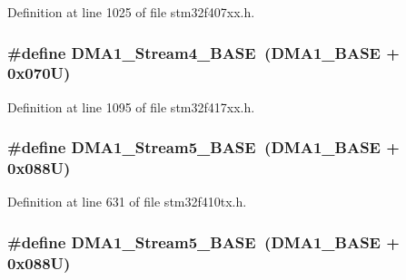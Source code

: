 Definition at line 1025 of file stm32f407xx.\+h.

\subsubsection[{\texorpdfstring{D\+M\+A1\+\_\+\+Stream4\+\_\+\+B\+A\+SE}{DMA1_Stream4_BASE}}]{\setlength{\rightskip}{0pt plus 5cm}\#define D\+M\+A1\+\_\+\+Stream4\+\_\+\+B\+A\+SE~({\bf D\+M\+A1\+\_\+\+B\+A\+SE} + 0x070\+U)}\hypertarget{group___peripheral__registers__structures_ga757a3c0d866c0fe68c6176156065a26b}{}\label{group___peripheral__registers__structures_ga757a3c0d866c0fe68c6176156065a26b}


Definition at line 1095 of file stm32f417xx.\+h.

\subsubsection[{\texorpdfstring{D\+M\+A1\+\_\+\+Stream5\+\_\+\+B\+A\+SE}{DMA1_Stream5_BASE}}]{\setlength{\rightskip}{0pt plus 5cm}\#define D\+M\+A1\+\_\+\+Stream5\+\_\+\+B\+A\+SE~({\bf D\+M\+A1\+\_\+\+B\+A\+SE} + 0x088\+U)}\hypertarget{group___peripheral__registers__structures_ga0ded7bed8969fe2e2d616e7f90eb7654}{}\label{group___peripheral__registers__structures_ga0ded7bed8969fe2e2d616e7f90eb7654}


Definition at line 631 of file stm32f410tx.\+h.

\subsubsection[{\texorpdfstring{D\+M\+A1\+\_\+\+Stream5\+\_\+\+B\+A\+SE}{DMA1_Stream5_BASE}}]{\setlength{\rightskip}{0pt plus 5cm}\#define D\+M\+A1\+\_\+\+Stream5\+\_\+\+B\+A\+SE~({\bf D\+M\+A1\+\_\+\+B\+A\+SE} + 0x088\+U)}\hypertarget{group___peripheral__registers__structures_ga0ded7bed8969fe2e2d616e7f90eb7654}{}\label{group___peripheral__registers__structures_ga0ded7bed8969fe2e2d616e7f90eb7654}


